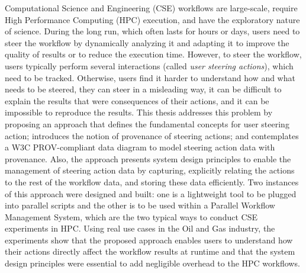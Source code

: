 \begin{foreignabstract}


Computational Science and Engineering (CSE) workflows are large-scale, require High Performance Computing (HPC) execution, and have the exploratory nature of science.
During the long run, which often lasts for hours or days, users need to steer the workflow by dynamically analyzing it and adapting it to improve the quality of results or to reduce the execution time. 
However, to steer the workflow, users typically perform several interactions (called \textit{user steering actions}), which need to be tracked.
Otherwise, users find it harder to understand how and what needs to be steered, they can steer in a misleading way, it can be difficult to explain the results that were consequences of their actions, and it can be impossible to reproduce the results.
This thesis addresses this problem by proposing an approach that defines the fundamental concepts for user steering action; introduces the notion of provenance of steering actions; and contemplates a W3C PROV-compliant data diagram to model steering action data with provenance.
Also, the approach presents system design principles to enable the management of steering action data by capturing, explicitly relating the actions to the rest of the workflow data, and storing these data efficiently.
Two instances of this approach were designed and built: one is a lightweight tool to be plugged into parallel scripts and the other is to be used within a Parallel Workflow Management System, which are the two typical ways to conduct CSE experiments in HPC.
Using real use cases in the Oil and Gas industry, the experiments show that the proposed approach enables users to understand how their actions directly affect the workflow results at runtime and that the system design principles were essential to add 
negligible overhead to the HPC workflows.

\end{foreignabstract}

